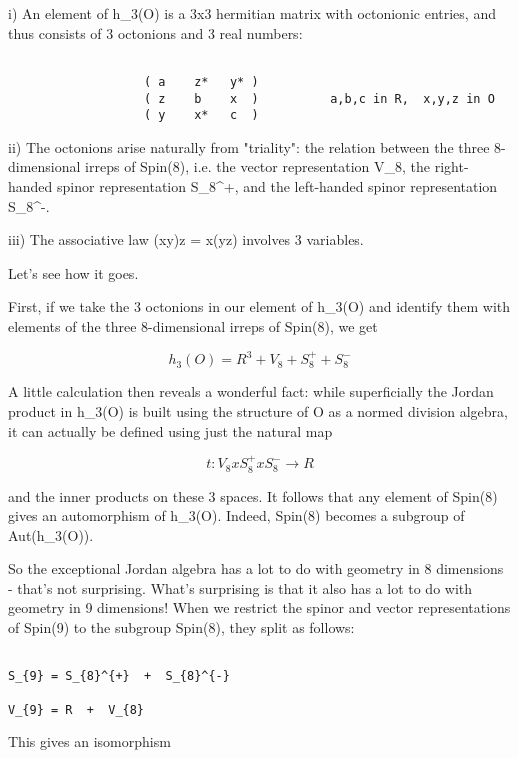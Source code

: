 i) An element of h_{3}(O) is a 3x3 hermitian matrix with octonionic
entries, and thus consists of 3 octonions and 3 real numbers:


\begin{verbatim}

                   ( a    z*   y* )
                   ( z    b    x  )          a,b,c in R,  x,y,z in O
                   ( y    x*   c  )            
\end{verbatim}
    
ii) The octonions arise naturally from "triality": the
relation between the three 8-dimensional irreps of Spin(8), i.e. the
vector representation V_{8}, the right-handed spinor
representation S_{8}^{+}, and the left-handed spinor
representation S_{8}^{-}.

iii) The associative law (xy)z = x(yz) involves 3 variables.

Let's see how it goes.


First, if we take the 3 octonions in our element of h_{3}(O) and
identify them with elements of the three 8-dimensional irreps of
Spin(8), we get


$$

h_{3}(O) = R^{3}  +  V_{8}  +  S_{8}^{+}  +  S_{8}^{-} 
$$
    

A little calculation then reveals a wonderful fact: while superficially
the Jordan product in h_{3}(O) is built using the structure of O
as a normed division algebra, it can actually be defined using just the
natural map


$$

t: V_{8}  x  S_{8}^{+}  x  S_{8}^{-} \to  R
$$
    

and the inner products on these 3 spaces.  It follows that any element
of Spin(8) gives an automorphism of h_{3}(O).  Indeed, Spin(8)
becomes a subgroup of Aut(h_{3}(O)).

So the exceptional Jordan algebra has a lot to do with geometry in 8
dimensions - that's not surprising.  What's surprising is that it also
has a lot to do with geometry in 9 dimensions!  When we restrict the
spinor and vector representations of Spin(9) to the subgroup Spin(8),
they split as follows:


\begin{verbatim}

S_{9} = S_{8}^{+}  +  S_{8}^{-}

V_{9} = R  +  V_{8}
\end{verbatim}
    
This gives an isomorphism


